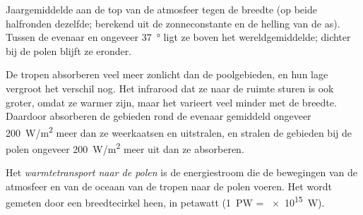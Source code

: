 \begin{omfigure}

{\small Jaargemiddelde  aan de top van de atmosfeer tegen de breedte
(op beide halfronden dezelfde; berekend uit de zonneconstante en de helling van
de as). Tussen de evenaar en ongeveer \qty{37}{\degree} ligt ze boven het
wereldgemiddelde; dichter bij de polen blijft ze eronder.}
\end{omfigure}

De tropen absorberen veel meer zonlicht dan de poolgebieden, en hun lage 
vergroot het verschil nog. Het infrarood dat ze naar de ruimte sturen is ook
groter, omdat ze warmer zijn, maar het varieert veel minder met de breedte.
Daardoor absorberen de gebieden rond de evenaar gemiddeld ongeveer
\qty{200}{W/m^2} meer dan ze weerkaatsen en uitstralen, en stralen de gebieden
bij de polen ongeveer \qty{200}{W/m^2} meer uit dan ze absorberen.

\begin{definition}\label{def:g10:earth-energy-budget:heat-transport}
Het \emph{warmtetransport naar de polen}
is de energiestroom die de bewegingen van de atmosfeer en van de oceaan van de
tropen naar de polen voeren. Het wordt gemeten door een breedtecirkel heen, in
petawatt (\qty{1}{PW} = \qty{e15}{W}).
\end{definition}

